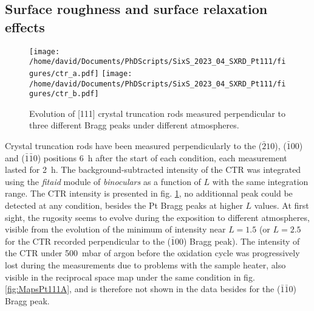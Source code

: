 
\subsection{Surface roughness and surface relaxation effects}

\begin{figure}[!htb]
    \centering
    \texttt{[image: /home/david/Documents/PhDScripts/SixS\_2023\_04\_SXRD\_Pt111/figures/ctr\_a.pdf]}
    \texttt{[image: /home/david/Documents/PhDScripts/SixS\_2023\_04\_SXRD\_Pt111/figures/ctr\_b.pdf]}
    \caption{
        Evolution of [111] crystal truncation rods measured perpendicular to three different Bragg peaks under different atmospheres.
    }
    \label{fig:CTRPt111}
\end{figure}

Crystal truncation rods have been measured perpendicularly to the ($\bar{2}10$), ($\bar{1}00$) and ($\bar{1}\bar{1}0$) positions \qty{6}{\hour} after the start of each condition, each measurement lasted for \qty{2}{\hour}.
The background-subtracted intensity of the CTR was integrated using the \textit{fitaid} module of \textit{binoculars} as a function of $L$ with the same integration range.%
The CTR intensity is presented in fig. \ref{fig:CTRPt111}, no additionnal peak could be detected at any condition, besides the Pt Bragg peaks at higher $L$ values.
At first sight, the rugosity seems to evolve during the exposition to different atmospheres, visible from the evolution of the minimum of intensity near $L=1.5$ (or $L=2.5$ for the CTR recorded perpendicular to the ($\bar{1}$00) Bragg peak).
The intensity of the CTR under \qty{500}{\milli\bar} of argon before the oxidation cycle was progressively lost during the measurements due to problems with the sample heater, also visible in the reciprocal space map under the same condition in fig. \ref{fig:MapsPt111A}, and is therefore not shown in the data besides for the ($\bar{1}\bar{1}$0) Bragg peak.

